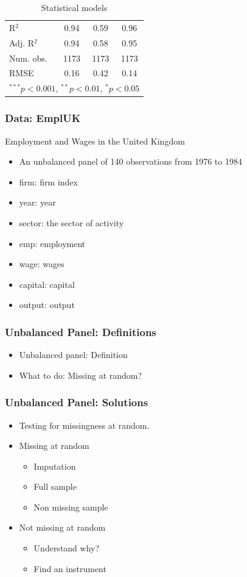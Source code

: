 \documentclass{beamer}
\newcommand{\1}{\mathbb{1}}
\begin{document}
\begin{frame}
\begin{table}
\begin{center}
\begin{tabular}{l c c c }
\hline
R$^2$                     & 0.94          & 0.59          & 0.96          \\
Adj. R$^2$                & 0.94          & 0.58          & 0.95          \\
Num. obs.                 & 1173          & 1173          & 1173          \\
RMSE                      & 0.16          & 0.42          & 0.14          \\
\hline
\multicolumn{4}{l}{\scriptsize{$^{***}p<0.001$, $^{**}p<0.01$, $^*p<0.05$}}
\end{tabular}
\caption{Statistical models}
\label{table:coefficients}
\end{center}
\end{table}
\end{frame}


\begin{frame}\frametitle{Data: EmplUK}
Employment and Wages in the United Kingdom
\begin{itemize}
\item An unbalanced panel of 140 observations from 1976 to 1984
\item firm: firm index
\item year: year
\item sector: the sector of activity
\item emp: employment
\item wage: wages
\item capital: capital
\item output: output
\end{itemize}
\end{frame}

\begin{frame}\frametitle{Unbalanced Panel: Definitions}
\begin{itemize}
\item Unbalanced panel: Definition
\item What to do: Missing at random?
\end{itemize}
\end{frame}

\begin{frame}\frametitle{Unbalanced Panel: Solutions}
\begin{itemize}
\item Testing for missingness at random.
\item Missing at random
\begin{itemize}
\item Imputation
\item Full sample 
\item Non missing sample
\end{itemize}
\item Not missing at random
\begin{itemize}
\item Understand why?
\item Find an instrument
\end{itemize}
\end{itemize}
\end{frame}
\end{document}
